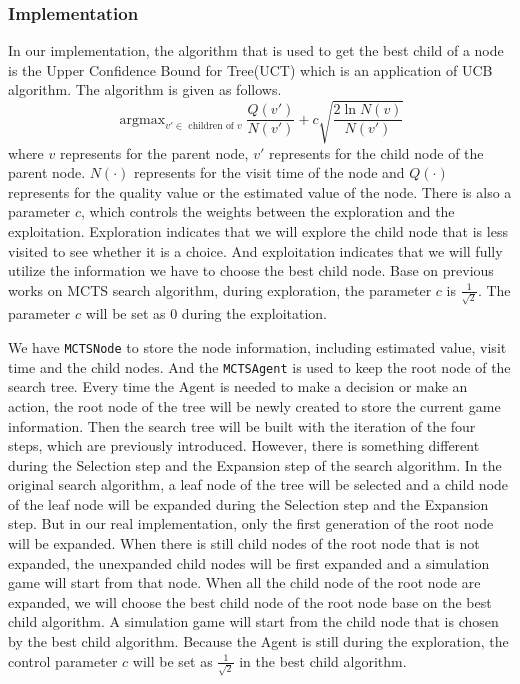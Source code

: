 \subsubsection{Implementation}
In our implementation, the algorithm that is used to get the best child of a node is the Upper Confidence Bound for Tree(UCT) which is an application of UCB algorithm. 
The algorithm is given as follows. 
\begin{equation*}
    \mathop{\arg\max}_{v' \in\textrm{ children of }v} \frac{Q(v')}{N(v')} + c\sqrt{\frac{2\ln N(v)}{N(v')}}
\end{equation*}
where $v$ represents for the parent node, $v'$ represents for the child node of the parent node. 
$N(\cdot)$ represents for the visit time of the node and $Q(\cdot)$ represents for the quality value or the estimated value of the node. 
There is also a parameter $c$, which controls the weights between the exploration and the exploitation. 
Exploration indicates that we will explore the child node that is less visited to see whether it is a choice. 
And exploitation indicates that we will fully utilize the information we have to choose the best child node. 
Base on previous works on MCTS search algorithm, during exploration, the parameter $c$ is $\frac{1}{\sqrt{2}}$.
The parameter $c$ will be set as 0 during the exploitation. 

We have \verb|MCTSNode| to store the node information, including estimated value, visit time and the child nodes. 
And the \verb|MCTSAgent| is used to keep the root node of the search tree. 
Every time the Agent is needed to make a decision or make an action, the root node of the tree will be newly created to store the current game information. 
Then the search tree will be built with the iteration of the four steps, which are previously introduced. 
However, there is something different during the Selection step and the Expansion step of the search algorithm. 
In the original search algorithm, a leaf node of the tree will be selected and a child node of the leaf node will be expanded during the Selection step and the Expansion step. 
But in our real implementation, only the first generation of the root node will be expanded. 
When there is still child nodes of the root node that is not expanded, the unexpanded child nodes will be first expanded and a simulation game will start from that node. 
When all the child node of the root node are expanded, we will choose the best child node of the root node base on the best child algorithm. 
A simulation game will start from the child node that is chosen by the best child algorithm. 
Because the Agent is still during the exploration, the control parameter $c$ will be set as $\frac{1}{\sqrt{2}}$ in the best child algorithm. 


